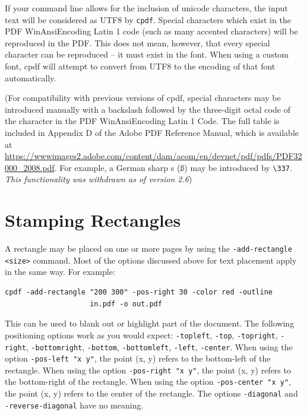 \documentclass{book}
\begin{document}
If your command line allows for the inclusion of unicode characters, the input
text will be considered as UTF8 by \verb!cpdf!. Special characters which exist
in the PDF WinAnsiEncoding Latin 1 code (such as many accented characters) will
be reproduced in the PDF. This does not mean, however, that every special
character can be reproduced -- it must exist in the font. When using a custom font, cpdf will attempt to convert from UTF8 to the encoding of that font automatically.

(For compatibility with previous versions of cpdf, special characters may be
introduced manually with a backslash followed by the three-digit octal code of
the character in the PDF WinAnsiEncoding Latin 1 Code. The full table is
included in Appendix D of the Adobe PDF Reference Manual, which is available at
\url{https://wwwimages2.adobe.com/content/dam/acom/en/devnet/pdf/pdfs/PDF32000_2008.pdf}. For example, a German sharp s (\ss) may be introduced by \verb!\337!. \textit{This functionality was withdrawn as of version 2.6})

\section{Stamping Rectangles}

A rectangle may be placed on one or more pages by using the \texttt{-add-rectangle <size>} command. Most of the options discussed above for text placement apply in the same way. For example:

\begin{framed}
  \small\begin{verbatim}cpdf -add-rectangle "200 300" -pos-right 30 -color red -outline
                    in.pdf -o out.pdf\end{verbatim}
\end{framed}

\noindent This can be used to blank out or highlight part of the document. The following positioning options work as you would expect: \texttt{-topleft}, \texttt{-top}, \texttt{-topright}, \texttt{-right}, \texttt{-bottomright}, \texttt{-bottom}, \texttt{-bottomleft}, \texttt{-left}, \texttt{-center}. When using the option \texttt{-pos-left "x y"}, the point (x, y) refers to the bottom-left of the rectangle. When using the option \texttt{-pos-right "x y"}, the point (x, y) refers to the bottom-right of the rectangle. When using the option \texttt{-pos-center "x y"}, the point (x, y) refers to the center of the rectangle. The options \texttt{-diagonal} and \texttt{-reverse-diagonal} have no meaning.\pagestyle{empty}\thispagestyle{fancy}
\end{document}
